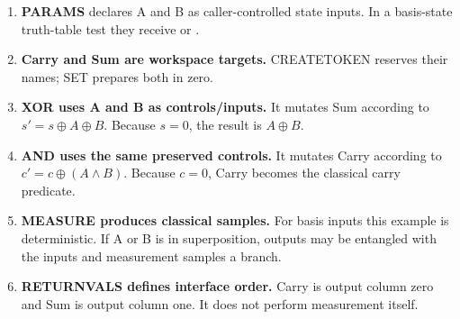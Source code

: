 \begin{enumerate}
  \item \textbf{PARAMS} declares A and B as caller-controlled state inputs.
  In a basis-state truth-table test they receive  or .
  \item \textbf{Carry and Sum are workspace targets.} CREATETOKEN reserves their
  names; SET prepares both in zero.
  \item \textbf{XOR uses A and B as controls/inputs.} It mutates Sum according
  to $s'=s\oplus A\oplus B$. Because $s=0$, the result is $A\oplus B$.
  \item \textbf{AND uses the same preserved controls.} It mutates Carry
  according to $c'=c\oplus(A\land B)$. Because $c=0$, Carry becomes the
  classical carry predicate.
  \item \textbf{MEASURE produces classical samples.} For basis inputs this
  example is deterministic. If A or B is in superposition, outputs may be
  entangled with the inputs and measurement samples a branch.
  \item \textbf{RETURNVALS defines interface order.} Carry is output column
  zero and Sum is output column one. It does not perform measurement itself.
\end{enumerate}

\begin{center}
\end{center}

